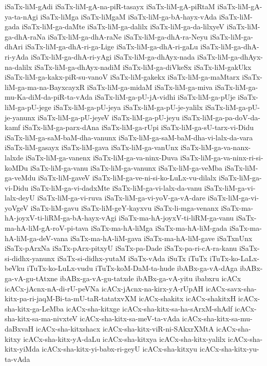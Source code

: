 {iSaTx-liM-gAdi
iSaTx-liM-gA-na-piR-tasayx
iSaTx-liM-gA-piRtaM
iSaTx-liM-gA-ya-ta-nAgi
iSaTx-liMga
iSaTx-liMgaM
iSaTx-liM-ga-bA-hayx-vAda
iSaTx-liM-gada
iSaTx-liM-ga-daMte
iSaTx-liM-ga-dalilx
iSaTx-liM-ga-da-lilxyeV
iSaTx-liM-ga-dhA-raNa
iSaTx-liM-ga-dhA-raNe
iSaTx-liM-ga-dhA-ra-Neyu
iSaTx-liM-ga-dhAri
iSaTx-liM-ga-dhA-ri-ga-Lige
iSaTx-liM-ga-dhA-ri-gaLu
iSaTx-liM-ga-dhA-ri-yAda
iSaTx-liM-ga-dhA-ri-yAgi
iSaTx-liM-ga-dhAyx-nada
iSaTx-liM-ga-dhAyx-na-dalilx
iSaTx-liM-ga-dhAyx-nadiM
iSaTx-liM-ga-diVkeSx
iSaTx-liM-gakUkx
iSaTx-liM-ga-kakx-piR-su-vanoV
iSaTx-liM-gakekx
iSaTx-liM-ga-maMtarx
iSaTx-liM-ga-ma-na-BayxcayxR
iSaTx-liM-ga-midaM
iSaTx-liM-ga-miva
iSaTx-liM-ga-mu-Ka-diM-da-piR-ta-vAda
iSaTx-liM-ga-pU-jA-vidhi
iSaTx-liM-ga-pUje
iSaTx-liM-ga-pU-jege
iSaTx-liM-ga-pU-jeya
iSaTx-liM-ga-pU-je-yalilx
iSaTx-liM-ga-pU-je-yanunx
iSaTx-liM-ga-pU-jeyeV
iSaTx-liM-ga-pU-jeyu
iSaTx-liM-ga-pa-doV-da-kamf
iSaTx-liM-ga-parx-dAna
iSaTx-liM-ga-rUpi
iSaTx-liM-ga-sU-tarx-vi-Didu
iSaTx-liM-ga-saM-baM-dha-vanunx
iSaTx-liM-ga-saM-baM-dha-vi-lalx-da-vara
iSaTx-liM-gasayx
iSaTx-liM-gava
iSaTx-liM-ga-vanUnx
iSaTx-liM-ga-va-nanx-lalxde
iSaTx-liM-ga-vanenx
iSaTx-liM-ga-va-ninx-Duva
iSaTx-liM-ga-va-ninx-ri-si-koMDu
iSaTx-liM-ga-vanu
iSaTx-liM-ga-vanunx
iSaTx-liM-ga-veMba
iSaTx-liM-ga-veMdu
iSaTx-liM-gaveV
iSaTx-liM-ga-ve-ni-si-ko-LuLx-vu-dilalx
iSaTx-liM-ga-vi-Didu
iSaTx-liM-ga-vi-dadxMte
iSaTx-liM-ga-vi-lalx-da-vanu
iSaTx-liM-ga-vi-lalx-deyU
iSaTx-liM-ga-vi-ruva
iSaTx-liM-ga-vi-yoV-ga-vA-dare
iSaTx-liM-ga-vi-yoVgeV
iSaTx-liM-gavu
iSaTx-liM-geY-kayxvu
iSaTx-li-mga-venanx
iSaTx-ma-hA-joyxV-ti-liRM-ga-bA-hayx-vAgi
iSaTx-ma-hA-joyxV-ti-liRM-ga-vanu
iSaTx-ma-hA-liM-gA-roV-pi-tava
iSaTx-ma-hA-liMga
iSaTx-ma-hA-liM-gada
iSaTx-ma-hA-liM-ga-deV-vana
iSaTx-ma-hA-liM-gava
iSaTx-ma-hA-liM-gave
iSaTxnUnx
iSaTx-pArxNa
iSaTx-pArx-pitxyU
iSaTx-pa-Dade
iSaTx-pa-ri-cA-ra-kanu
iSaTx-si-didhx-yanunx
iSaTx-si-didhx-yutaM
iSaTx-vAda
iSuTx
iTuTx
iTuTx-ko-LaLx-beVku
iTuTx-ko-LuLx-vudu
iTuTx-koM-DaM-ta-hude
ibABx-ga-vA-dAga
ibABx-ga-vA-gu-tAtxne
ibABx-ga-vA-gu-tatxde
ibABx-ga-vA-yitu
ibabxru
icACx
icACx-jAcnx-nA-di-rU-peVNa
icACx-jAcnx-na-kirx-yA-rUpAH
icACx-savx-sha-kitx-pa-ri-jaqM-Bi-ta-mU-taR-tatatxvXM
icACx-shakitx
icACx-shakitxH
icACx-sha-kitx-ga-LeMba
icACx-sha-kitxge
icACx-sha-kitx-sa-ha-sArxM-shAdf
icACx-sha-kitx-sa-ma-nivxteV
icACx-sha-kitx-sa-meV-ta-vAda
icACx-sha-kitx-sa-mu-daBxvaH
icACx-sha-kitxshacx
icACx-sha-kitx-viR-ni-SAkxrXMtA
icACx-sha-kitxy
icACx-sha-kitx-yA-daLu
icACx-sha-kitxya
icACx-sha-kitx-yalilx
icACx-sha-kitx-yiMda
icACx-sha-kitx-yi-babx-ri-geyU
icACx-sha-kitxyu
icACx-sha-kitx-yu-ta-vAda
}
